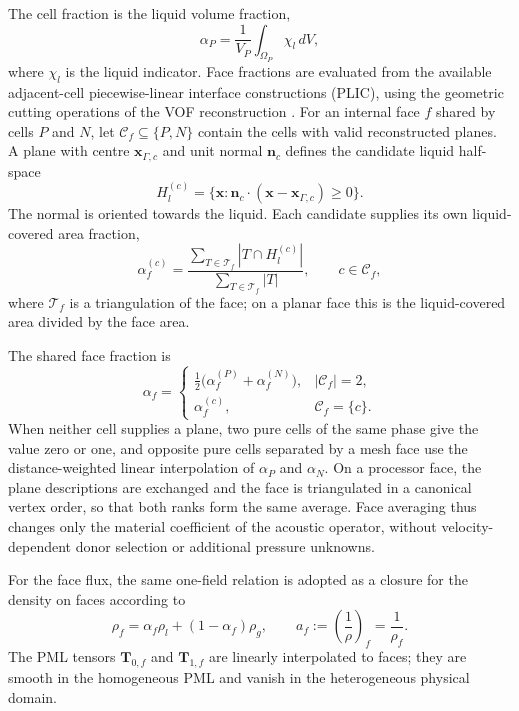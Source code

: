 \documentclass[final,12pt,nopreprintline,longtitle]{elsarticle}
\newcommand{\x}{\mathbf{x}}
\begin{document}
The cell fraction is the liquid volume fraction,
\begin{equation}
    \alpha_P=\frac{1}{V_P}\int_{\Omega_P}\chi_l\,dV,
    \label{eq:geometricFractions}
\end{equation}
where $\chi_l$ is the liquid indicator.  Face fractions are evaluated from the
available adjacent-cell piecewise-linear interface constructions (PLIC), using
the geometric cutting operations of the VOF reconstruction
\cite{Roenby2016,Scheufler2019,Liu2023incons}.
For an internal face $f$ shared by cells $P$ and $N$, let
$\mathcal C_f\subseteq\{P,N\}$ contain the cells with valid reconstructed
planes.  A plane with centre $\x_{\Gamma,c}$ and unit normal $\mathbf n_c$
defines the candidate liquid half-space
\[
    H_l^{(c)}
    =\{\x:\mathbf n_c\cdot(\x-\x_{\Gamma,c})\geq 0\}.
\]
The normal is oriented towards the liquid.  Each candidate supplies its own
liquid-covered area fraction,
\begin{equation}
    \alpha_f^{(c)}
    =\frac{\displaystyle\sum_{T\in\mathcal T_f}
                |T\cap H_l^{(c)}|}
           {\displaystyle\sum_{T\in\mathcal T_f}|T|},
    \qquad c\in\mathcal C_f ,
    \label{eq:candidateFaceFraction}
\end{equation}
where $\mathcal T_f$ is a triangulation of the face; on a planar face this is
the liquid-covered area divided by the face area.

The shared face fraction is
\begin{equation}
    \alpha_f=
    \begin{cases}
        \tfrac12\bigl(\alpha_f^{(P)}+\alpha_f^{(N)}\bigr),
            & |\mathcal C_f|=2,\\
        \alpha_f^{(c)}, & \mathcal C_f=\{c\}.
    \end{cases}
    \label{eq:averagedFaceFraction}
\end{equation}
When neither cell supplies a plane, two pure cells of the same phase give the
value zero or one, and opposite pure cells separated by a mesh face use the
distance-weighted linear interpolation of $\alpha_P$ and $\alpha_N$.  On a
processor face, the plane descriptions are exchanged and the face is
triangulated in a canonical vertex order, so that both ranks form the same
average.  Face averaging thus changes only the material coefficient of the
acoustic operator, without velocity-dependent donor selection or additional
pressure unknowns.

For the face flux, the same one-field relation is adopted as a closure for
the density on faces according to
\begin{equation}
    \rho_f=\alpha_f\rho_l+(1-\alpha_f)\rho_g,
    \qquad
    a_f:=\left(\frac{1}{\rho}\right)_f=\frac{1}{\rho_f}.
    \label{eq:faceInverseDensity}
\end{equation}
The PML tensors $\mathbf{T}_{0,f}$ and
$\mathbf{T}_{1,f}$ are linearly interpolated to faces; they are smooth in the
homogeneous PML and vanish in the heterogeneous physical domain.
\end{document}

